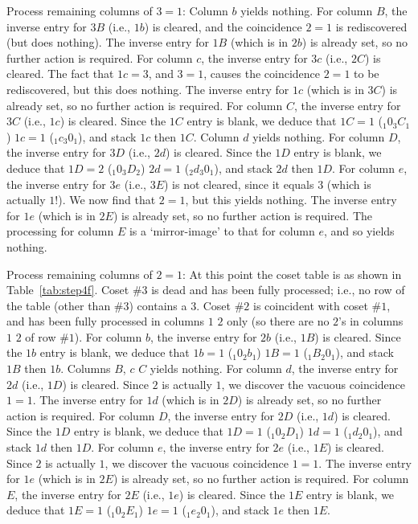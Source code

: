 Process remaining columns of $3=1$:
Column $b$ yields nothing.
%
For column $B$, the inverse entry for $3B$ (i.e., $1b$) is cleared, and the
  coincidence $2=1$ is rediscovered (but does nothing).
The inverse entry for $1B$ (which is in $2b$) is already set, so no
  further action is required.
%
For column $c$, the inverse entry for $3c$ (i.e., $2C$) is cleared.
The fact that $1c=3$, and $3=1$, causes the coincidence $2=1$ to be
  rediscovered, but this does nothing.
The inverse entry for $1c$ (which is in $3C$) is already set, so no
  further action is required.
%
For column $C$, the inverse entry for $3C$ (i.e., $1c$) is cleared.
Since the $1C$ entry is blank, we deduce that $1C=1$ ($_1 0_3 C_1$) \amp
  $1c=1$ ($_1 c_3 0_1$), and stack $1c$ then $1C$.
%
Column $d$ yields nothing.
%
For column $D$, the inverse entry for $3D$ (i.e., $2d$) is cleared.
Since the $1D$ entry is blank, we deduce that $1D=2$ ($_1 0_3 D_2$) \amp
  $2d=1$ ($_2 d_3 0_1$), and stack $2d$ then $1D$.
%
For column $e$, the inverse entry for $3e$ (i.e., $3E$) is not cleared,
  since it equals $3$ (which is actually $1$!).
We now find that $2=1$, but this yields nothing.
The inverse entry for $1e$ (which is in $2E$) is already set, so no
  further action is required.
%
The processing for column $E$ is a `mirror-image' to that for column $e$,
  and so yields nothing.

Process remaining columns of $2=1$:
At this point the coset table is as shown in Table~\ref{tab:step4f}.
Coset \#$3$ is dead and has been fully processed; i.e., no row of the table
  (other than \#$3$) contains a $3$.
Coset \#$2$ is coincident with coset \#$1$, and has been fully processed
  in columns $1$ \amp $2$ only (so there are no $2$'s in columns $1$ \amp
  $2$ of row \#$1$).
%
For column $b$, the inverse entry for $2b$ (i.e., $1B$) is cleared.
Since the $1b$ entry is blank, we deduce that $1b=1$ ($_1 0_2 b_1$) \amp
  $1B=1$ ($_1 B_2 0_1$), and stack $1B$ then $1b$.
%
Columns $B$, $c$ \amp $C$ yields nothing.
%
For column $d$, the inverse entry for $2d$ (i.e., $1D$) is cleared.
Since $2$ is actually $1$, we discover the vacuous coincidence $1=1$.
The inverse entry for $1d$ (which is in $2D$) is already set, so no
  further action is required.
%
For column $D$, the inverse entry for $2D$ (i.e., $1d$) is cleared.
Since the $1D$ entry is blank, we deduce that $1D=1$ ($_1 0_2 D_1$) \amp
  $1d=1$ ($_1 d_2 0_1$), and stack $1d$ then $1D$.
%
For column $e$, the inverse entry for $2e$ (i.e., $1E$) is cleared.
Since $2$ is actually $1$, we discover the vacuous coincidence $1=1$.
The inverse entry for $1e$ (which is in $2E$) is already set, so no
  further action is required.
%
For column $E$, the inverse entry for $2E$ (i.e., $1e$) is cleared.
Since the $1E$ entry is blank, we deduce that $1E=1$ ($_1 0_2 E_1$) \amp
  $1e=1$ ($_1 e_2 0_1$), and stack $1e$ then $1E$.

